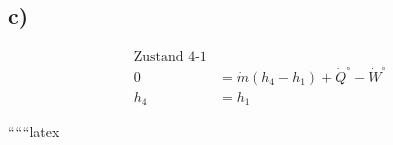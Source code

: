 

\subsection*{c)}

\begin{align*}
\text{Zustand 4-1} \\
0 &= \dot{m} (h_4 - h_1) + \dot{Q}^{\circ} - \dot{W}^{\circ} \\
h_4 &= h_1
\end{align*}

``````latex